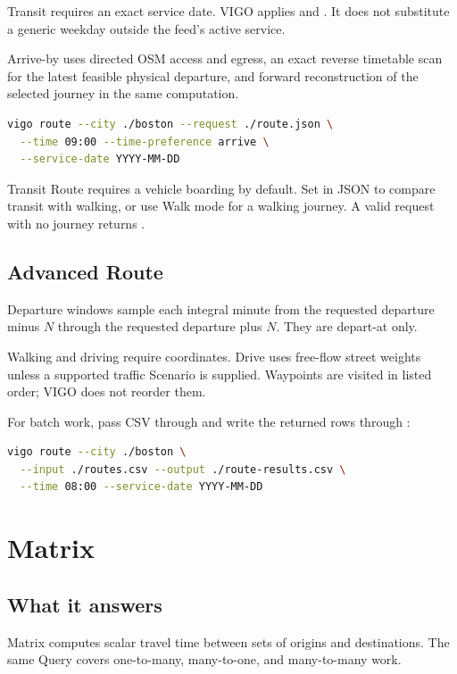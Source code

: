 \documentclass[10pt,letterpaper]{article}
\begin{document}
Transit requires an exact service date. VIGO applies  and . It does not substitute a generic weekday outside the feed's active service.

Arrive-by uses directed OSM access and egress, an exact reverse timetable scan for the latest feasible physical departure, and forward reconstruction of the selected journey in the same computation.

\begin{lstlisting}[language=bash]
vigo route --city ./boston --request ./route.json \
  --time 09:00 --time-preference arrive \
  --service-date YYYY-MM-DD
\end{lstlisting}

Transit Route requires a vehicle boarding by default. Set  in JSON to compare transit with walking, or use Walk mode for a walking journey. A valid request with no journey returns .

\subsection{Advanced Route}

Departure windows sample each integral minute from the requested departure minus $N$ through the requested departure plus $N$. They are depart-at only.

Walking and driving require coordinates. Drive uses free-flow street weights unless a supported traffic Scenario is supplied. Waypoints are visited in listed order; VIGO does not reorder them.

For batch work, pass CSV through \field{--input} and write the returned rows through \field{--output}:

\begin{lstlisting}[language=bash]
vigo route --city ./boston \
  --input ./routes.csv --output ./route-results.csv \
  --time 08:00 --service-date YYYY-MM-DD
\end{lstlisting}

\section{Matrix}

\subsection{What it answers}

Matrix computes scalar travel time between sets of origins and destinations. The same Query covers one-to-many, many-to-one, and many-to-many work.
\end{document}
